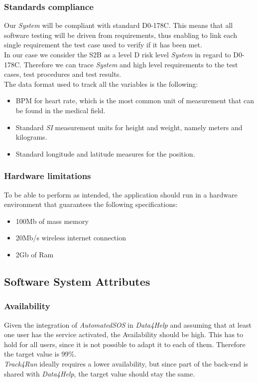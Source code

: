 \documentclass[titlepage]{article}
\begin{document}
			\subsubsection{Standards compliance}
			Our {\it System} will be compliant with standard D0-178C. This means that all software testing will be driven from 			requirements, thus enabling to link each single requirement the test case used to verify if it has been met.\\
			In our case we consider the S2B as a level D risk level {\it System} in regard to D0-178C. Therefore we can trace 			{\it System} and high level requirements to the test cases, test procedures and test results.\\
			The data format used to track all the variables is the following:
			\begin{itemize}
				\item BPM for heart rate, which is the most common unit of measurement that can be found in the 					medical field.
				\item Standard {\it SI} measurement units for height and  weight, namely meters and kilograms.
				\item Standard longitude and latitude measures for the position.
			\end{itemize}
		
			\subsubsection{Hardware limitations}
			To be able to perform as intended, the application should run in a hardware environment that guarantees the 			following specifications:
			\begin{itemize}
				\item 100Mb of mass memory 
				\item 20Mb/s wireless internet connection
				\item 2Gb of Ram 
			\end{itemize}
						
			
		\subsection{Software System Attributes}
			\subsubsection{Availability}
			Given the integration of {\it AutomatedSOS} in {\it Data4Help} and assuming that at least one user has the service 			activated, the Availability should be high. This has to hold for all users, since it is not possible to adapt it to 			each of them. Therefore the target value is 99\%. \\
			{\it Track4Run} ideally requires a lower availability, but since part of the back-end is shared with {\it Data4Help}, the 			target value should stay the same.\\
\end{document}
